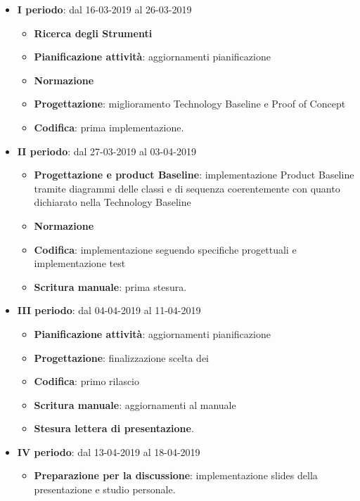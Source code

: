 		\begin{itemize}
			\item \textbf{I periodo}: dal 16-03-2019 al 26-03-2019
			\begin{itemize}
    	        \item \textbf{Ricerca degli Strumenti}
    	        \item \textbf{Pianificazione attività}: aggiornamenti pianificazione
    	        \item \textbf{Normazione}
    	        \item \textbf{Progettazione}: miglioramento Technology Baseline e Proof of Concept
    	        \item \textbf{Codifica}: prima implementazione.
        	\end{itemize}
			\item \textbf{II periodo}: dal 27-03-2019 al 03-04-2019
			\begin{itemize}
				\item \textbf{Progettazione e product Baseline}: implementazione Product Baseline tramite diagrammi delle classi e di sequenza
				coerentemente con quanto dichiarato nella Technology Baseline
    	        \item \textbf{Normazione}
    	        \item \textbf{Codifica}: implementazione seguendo specifiche progettuali e implementazione test
    	        \item \textbf{Scritura manuale}: prima stesura.
        	\end{itemize}
        	\item \textbf{III periodo}: dal 04-04-2019 al 11-04-2019
			\begin{itemize}
				\item \textbf{Pianificazione attività}: aggiornamenti pianificazione
    	        \item \textbf{Progettazione}: finalizzazione scelta dei 
    	        \item \textbf{Codifica}: primo rilascio
    	        \item \textbf{Scritura manuale}: aggiornamenti al manuale
    	        \item \textbf{Stesura lettera di presentazione}.
        	\end{itemize}
        	\item \textbf{IV periodo}: dal 13-04-2019 al 18-04-2019
			\begin{itemize}
				\item \textbf{Preparazione per la discussione}: implementazione slides della presentazione e studio personale.
        	\end{itemize}
        \end{itemize}
